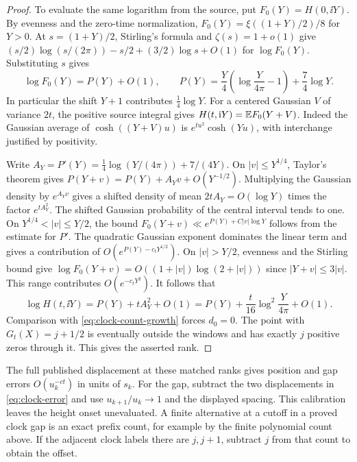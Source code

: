 \begin{proof}
To evaluate the same logarithm from the source, put
\(F_0(Y)=H(0,\ii Y)\).
By evenness and the zero-time normalization,
\(F_0(Y)=\xi((1+Y)/2)/8\) for \(Y>0\). At
\(s=(1+Y)/2\), Stirling's formula and \(\zeta(s)=1+o(1)\)
give \((s/2)\log(s/(2\pi))-s/2+(3/2)\log s+O(1)\)
for \(\log F_0(Y)\). Substituting \(s\) gives
\[
 \log F_0(Y)=P(Y)+O(1),\qquad
 P(Y)=\frac{Y}{4}\left(\log\frac{Y}{4\pi}-1\right)
                       +\frac74\log Y .
\]
In particular the shift \(Y+1\) contributes \(\tfrac14\log Y\).
For a centered Gaussian \(V\) of variance \(2t\), the positive
source integral gives \(H(t,\mathrm i Y)=\mathbb E F_0(Y+V)\).
Indeed the Gaussian average of \(\cosh((Y+V)u)\) is
\(e^{tu^2}\cosh(Yu)\), with interchange justified by positivity.

Write \(A_Y=P'(Y)=\tfrac14\log(Y/(4\pi))+7/(4Y)\).
On \(|v|\le Y^{1/4}\), Taylor's theorem gives
\(P(Y+v)=P(Y)+A_Yv+O(Y^{-1/2})\). Multiplying the
Gaussian density by \(e^{A_Yv}\) gives a shifted density of
mean \(2tA_Y=O(\log Y)\) times the factor \(e^{tA_Y^2}\).
The shifted Gaussian probability of the central interval tends
to one. On \(Y^{1/4}<|v|\le Y/2\), the bound
\(F_0(Y+v)\ll e^{P(Y)+C|v|\log Y}\) follows from the
estimate for \(P'\). The quadratic Gaussian exponent
dominates the linear term and gives a contribution of
\(O(e^{P(Y)-c_tY^{1/2}})\). On \(|v|>Y/2\),
evenness and the Stirling bound give
\(\log F_0(Y+v)=O((1+|v|)\log(2+|v|))\) since
\(|Y+v|\le3|v|\). This range contributes
\(O(e^{-c_tY^2})\). It follows that
\[
 \log H(t,\ii Y)=P(Y)+tA_Y^2+O(1)
               =P(Y)+\frac{t}{16}\log^2\frac{Y}{4\pi}+O(1).
\]
Comparison with \eqref{eq:clock-count-growth} forces \(d_0=0\).
The point with \(G_t(X)=j+1/2\) is eventually outside the
windows and has exactly \(j\) positive zeros through it.
This gives the asserted rank.
\end{proof}

The full published displacement at these matched ranks gives
position and gap errors \(O(u_k^{-ct})\) in units of \(s_k\).
For the gap, subtract the two displacements in
\eqref{eq:clock-error} and use \(u_{k+1}/u_k\to1\) and the
displayed spacing. This calibration leaves the height onset
unevaluated. A finite alternative at a cutoff in a proved clock
gap is an exact prefix count, for example by the finite
polynomial count above. If the adjacent clock labels there are
\(j,j+1\), subtract \(j\) from that count to obtain the offset.

